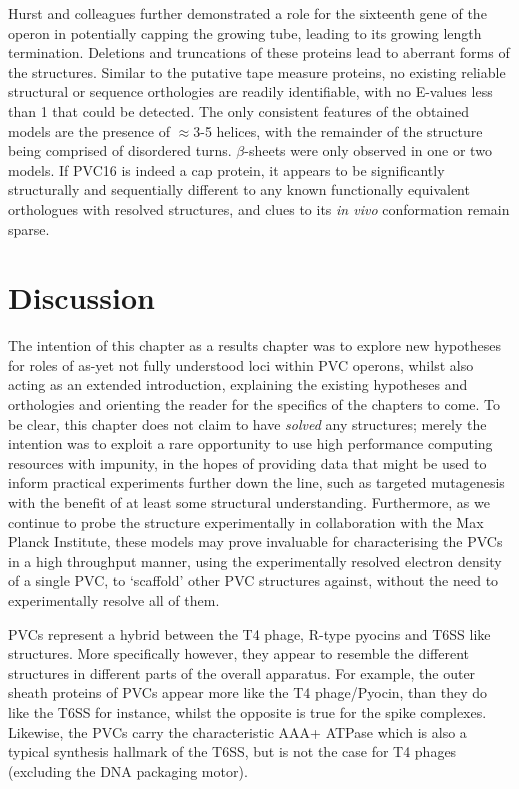 Hurst and colleagues further demonstrated a role for the sixteenth gene of the operon in potentially capping the growing tube, leading to its growing length termination. Deletions and truncations of these proteins lead to aberrant forms of the structures. Similar to the putative tape measure proteins, no existing reliable structural or sequence orthologies are readily identifiable, with no E-values less than 1 that could be detected. The only consistent features of the obtained models are the presence of $\approx$3-5 helices, with the remainder of the structure being comprised of disordered turns. $\beta$-sheets were only observed in one or two models. If PVC16 is indeed a cap protein, it appears to be significantly structurally and sequentially different to any known functionally equivalent orthologues with resolved structures, and clues to its \emph{in vivo} conformation remain sparse.



\clearpage
\section{Discussion}
The intention of this chapter as a results chapter was to explore new hypotheses for roles of as-yet not fully understood loci within PVC operons, whilst also acting as an extended introduction, explaining the existing hypotheses and orthologies and orienting the reader for the specifics of the chapters to come. To be clear, this chapter does not claim to have \emph{solved} any structures; merely the intention was to exploit a rare opportunity to use high performance computing resources with impunity, in the hopes of providing data that might be used to inform practical experiments further down the line, such as targeted mutagenesis with the benefit of at least some structural understanding. Furthermore, as we continue to probe the structure experimentally in collaboration with the Max Planck Institute, these models may prove invaluable for characterising the PVCs in a high throughput manner, using the experimentally resolved electron density of a single PVC, to `scaffold' other PVC structures against, without the need to experimentally resolve all of them.

PVCs represent a hybrid between the T4 phage, R-type pyocins and T6SS like structures. More specifically however, they appear to resemble the different structures in different parts of the overall apparatus. For example, the outer sheath proteins of PVCs appear more like the T4 phage/Pyocin, than they do like the T6SS for instance, whilst the opposite is true for the spike complexes. Likewise, the PVCs carry the characteristic AAA+ ATPase which is also a typical synthesis hallmark of the T6SS, but is not the case for T4 phages (excluding the DNA packaging motor).

